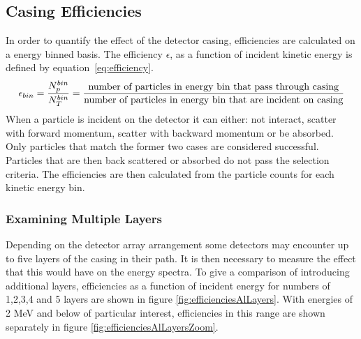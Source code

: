 \subsection{Casing Efficiencies}
In order to quantify the effect of the detector casing, efficiencies are calculated on a energy binned basis. The efficiency $\epsilon$, as a function of incident kinetic energy is defined by equation~\ref{eq:efficiency}. 
\begin{equation}
\epsilon_{bin} = \frac{N_{p}^{bin}}{N_{T}^{bin}} = \frac{\textnormal{number of particles in energy bin that pass through casing}} {\textnormal{number of particles in energy bin that are incident on casing}}
\label{eq:efficiency}
\end{equation}
When a particle is incident on the detector it can either: not interact, scatter with forward momentum, scatter with backward momentum or be absorbed. Only particles that match the former two cases are considered successful. Particles that are then back scattered or absorbed do not pass the selection criteria. The efficiencies are then calculated from the particle counts for each kinetic energy bin.

\subsubsection{Examining Multiple Layers}
Depending on the detector array arrangement some detectors may encounter up to five layers of the casing in their path. It is then necessary to measure the effect that this would have on the energy spectra. To give a comparison of introducing additional layers, efficiencies as a function of incident energy for numbers of 1,2,3,4 and 5 layers are shown in figure \ref{fig:efficienciesAlLayers}. With energies of 2 MeV and below of particular interest, efficiencies in this range are shown separately in figure \ref{fig:efficienciesAlLayersZoom}.

